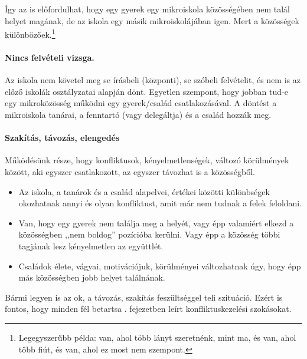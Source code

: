 Így az is előfordulhat, hogy egy gyerek egy mikroiskola közösségében nem talál
helyet magának, de az iskola egy másik mikroiskolájában igen. Mert a
közösségek különbözőek.\footnote{Legegyszerűbb példa: van, ahol több lányt
      szeretnénk, mint ma, és van, ahol több fiút, és van, ahol ez most nem
      szempont.}

\paragraph{Nincs felvételi vizsga.}
Az iskola nem követel meg se írásbeli (központi), se szóbeli
felvételit, és nem is az előző iskolák osztályzatai alapján dönt. Egyetlen
szempont, hogy jobban tud-e egy mikroközösség működni egy gyerek/család
csatlakozásával. A döntést a mikroiskola tanárai, a fenntartó (vagy
delegáltja) és a család hozzák meg.


\paragraph{Szakítás, távozás, elengedés}
Működésünk része, hogy konfliktusok, kényelmetlenségek, változó körülmények
között, aki egyszer csatlakozott, az egyszer távozhat is a közösségből.
\begin{itemize}
      \item Az iskola, a tanárok és a család alapelvei, értékei közötti
            különbségek okozhatnak annyi és olyan konfliktust, amit már nem
            tudnak a felek
            feloldani.
      \item Van, hogy egy gyerek nem találja meg a helyét, vagy épp valamiért
            elkezd a közösségben ,,nem boldog'' pozícióba kerülni. Vagy épp a
            közösség
            többi tagjának lesz kényelmetlen az együttlét.
      \item Családok élete, vágyai, motivációjuk, körülményei változhatnak úgy,
            hogy épp más közösségben jobb helyet találnának.
\end{itemize}

Bármi legyen is az ok, a távozás, szakítás feszültséggel teli szituáció. Ezért
is fontos, hogy minden fél betartsa  .
fejezetben leírt konfliktuskezelési szokásokat.